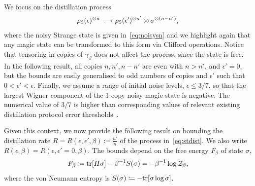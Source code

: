 \documentclass[pra,
aps,
twocolumn,
superscriptaddress,
groupedaddress,
nofootinbib,
reprint
]{revtex4-1}
\begin{document}
We focus on the distillation process
\begin{equation}\label{eq:stdist}
	\rho_{\rm{S}}(\epsilon)^{\otimes n} \longrightarrow \rho_{\rm{S}}(\epsilon')^{\otimes n'} \otimes \sigma^{\otimes (n-n')},
\end{equation}
where the noisy Strange state is given in~\cref{eq:noisysn} and we highlight again that any magic state can be transformed to this form via Clifford operations.
Notice that tensoring in copies of $\gamma_\beta$ does not affect the process, since the state is free.
In the following result, all copies $n, n', n - n'$ are even with $n > n'$, and $\epsilon'=0$, but the bounds are easily generalised to odd numbers of copies and $\epsilon'$ such that $0 < \epsilon' < \epsilon$. 
Finally, we assume a range of initial noise levels, $\epsilon \leq 3/7$, so that the largest Wigner component of the 1-copy noisy magic state is negative.
The numerical value of $3/7$ is higher than corresponding values of relevant existing distillation protocol error thresholds~\cite{cit:bravyi,cit:prakash}.

Given this context, we now provide the following result on bounding the distillation rate $R = R(\epsilon, \epsilon', \beta) \coloneqq \frac{n'}{n}$ of the process in~\cref{eq:stdist}. 
We also write $R(\epsilon, \beta) = R(\epsilon, \epsilon'=0, \beta)$.
The bounds depend on the free energy $F_\beta$ of state $\sigma$,
\begin{equation}
	F_\beta \coloneqq {\rm{tr}}[H \sigma] - \beta^{-1}S(\sigma) = -\beta^{-1}\log{\mathcal{Z}_\beta},
\end{equation}
where the von Neumann entropy is $S(\sigma) \coloneqq -{\rm{tr}}[\sigma\log{\sigma}]$.
\end{document}
